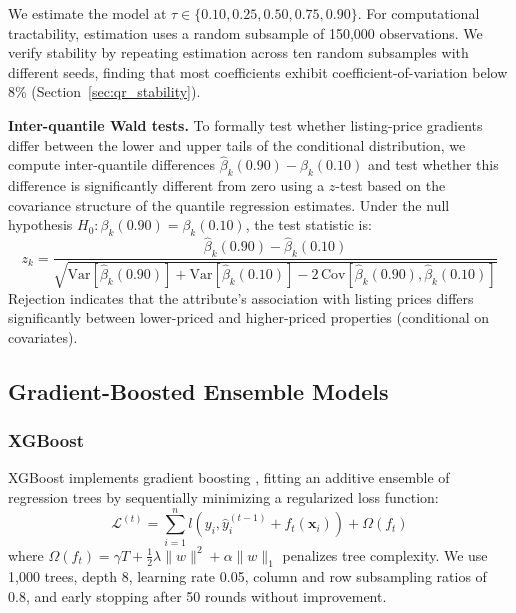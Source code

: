 We estimate the model at $\tau \in \{0.10, 0.25, 0.50, 0.75, 0.90\}$. For computational tractability, estimation uses a random subsample of 150,000 observations. We verify stability by repeating estimation across ten random subsamples with different seeds, finding that most coefficients exhibit coefficient-of-variation below 8\% (Section~\ref{sec:qr_stability}).

\textbf{Inter-quantile Wald tests.} To formally test whether listing-price gradients differ between the lower and upper tails of the conditional distribution, we compute inter-quantile differences $\hat{\beta}_k(0.90) - \hat{\beta}_k(0.10)$ and test whether this difference is significantly different from zero using a $z$-test based on the covariance structure of the quantile regression estimates. Under the null hypothesis $H_0: \beta_k(0.90) = \beta_k(0.10)$, the test statistic is:
\begin{equation}
    z_k = \frac{\hat{\beta}_k(0.90) - \hat{\beta}_k(0.10)}{\sqrt{\text{Var}[\hat{\beta}_k(0.90)] + \text{Var}[\hat{\beta}_k(0.10)] - 2\,\text{Cov}[\hat{\beta}_k(0.90), \hat{\beta}_k(0.10)]}}
    \label{eq:iqr_test}
\end{equation}
Rejection indicates that the attribute's association with listing prices differs significantly between lower-priced and higher-priced properties (conditional on covariates).

\subsection{Gradient-Boosted Ensemble Models}

\subsubsection{XGBoost}

XGBoost \citep{chen2016xgboost} implements gradient boosting \citep{friedman2001greedy}, fitting an additive ensemble of regression trees by sequentially minimizing a regularized loss function:
\begin{equation}
    \mathcal{L}^{(t)} = \sum_{i=1}^{n} l(y_i, \hat{y}_i^{(t-1)} + f_t(\mathbf{x}_i)) + \Omega(f_t)
\end{equation}
where $\Omega(f_t) = \gamma T + \frac{1}{2}\lambda \|w\|^2 + \alpha \|w\|_1$ penalizes tree complexity. We use 1,000 trees, depth 8, learning rate 0.05, column and row subsampling ratios of 0.8, and early stopping after 50 rounds without improvement.

